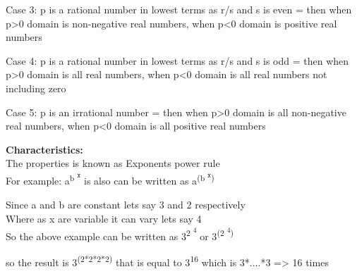 \documentclass[a4paper,10pt]{article}
\begin{document}
\indent\indent
{\fontsize{12}{16}\selectfont Case 3: p is a rational number in lowest terms as r/s and s is even = then when p>0 domain is non-negative real numbers, when p<0 domain is positive real numbers  \\}


\indent\indent
{\fontsize{12}{16}\selectfont Case 4: p is a rational number in lowest terms as r/s and s is odd = then when p>0 domain is all real numbers, when p<0 domain is all real numbers not including zero  \\}


\indent\indent
{\fontsize{12}{16}\selectfont Case 5: p is an  irrational number = then when p>0 domain is all non-negative real numbers, when p<0 domain is all positive real numbers  \\}

{\Large\textbf{Characteristics:}\\}
\newline
\indent\indent
{\fontsize{12}{16}\selectfont The properties is known as Exponents power rule \\}
\newline
\indent\indent
{\fontsize{12}{16}\selectfont For example: a\textsuperscript{b \textsuperscript{x}} is also can be written as a\textsuperscript{(b \textsuperscript{x})}}

\indent\indent\indent
{\fontsize{12}{16}\selectfont Since a and b are constant lets say 3 and 2 respectively \\}
\indent\indent\indent
{\fontsize{12}{16}\selectfont Where as x are variable it can vary lets say 4  \\}
\newline
\indent\indent\indent
{\fontsize{12}{16}\selectfont So the above example can be written as 3\textsuperscript{2 \textsuperscript{4}} or 3\textsuperscript{(2 \textsuperscript{4})} \\ }

\indent\indent\indent
{\fontsize{12}{16}\selectfont so the result is 3\textsuperscript{(2*2*2*2)} that is equal to 3\textsuperscript{16} which is 3*....*3 => 16 times }
\end{document}
